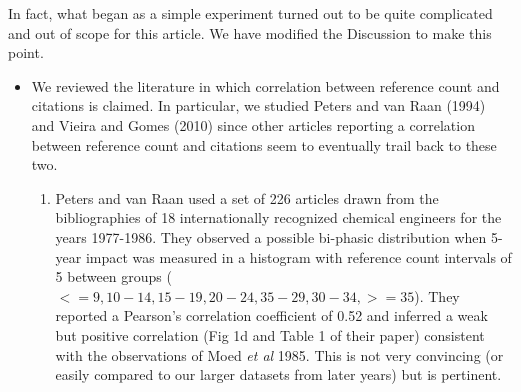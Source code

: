 \documentclass[11pt, oneside]{article}   	%
\begin{document}
In fact, what began as a simple experiment turned out to be quite complicated and out of scope for this article. We have modified the Discussion to make this point. 

\begin{itemize}
 \item We reviewed the literature in which correlation between reference count and citations is claimed. In particular, we studied Peters and van Raan (1994) and Vieira and Gomes (2010) since other articles reporting a correlation between reference count and citations seem to eventually trail back to these two. 
\begin{enumerate}
\item Peters and van Raan used a set of 226 articles drawn from the bibliographies of 18 internationally recognized chemical engineers for the years 1977-1986. They observed a possible bi-phasic distribution when 5-year impact was measured in a histogram with reference count intervals of 5 between groups ($<=9, 10-14, 15-19, 20-24, 35-29, 30-34, >=35$). They reported a Pearson's correlation coefficient of 0.52 and inferred a weak but positive correlation (Fig 1d and Table 1 of their paper) consistent with the observations of Moed \emph{et al} 1985. This is not very convincing (or easily compared to our larger datasets from later years) but is pertinent. 


\end{enumerate}
\end{itemize}
\end{document}
